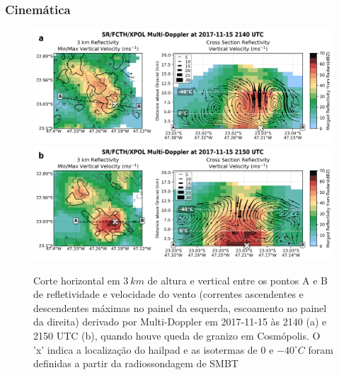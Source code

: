 \subsubsection{Cinemática}\label{cinematica_20171115}

\begin{figure}[htb]
	\centering
	\caption{Corte horizontal em $3\:km$ de altura e vertical entre os pontos A e B de refletividade e velocidade do vento (correntes ascendentes e descendentes máximas no painel da esquerda, escoamento no painel da direita) derivado por Multi-Doppler em 2017-11-15 às 2140 (a) e 2150 UTC (b), quando houve queda de granizo em Cosmópolis. O 'x' indica a localização do hailpad e as isotermas de $0$ e $-40^{\circ}C$ foram definidas a partir da radiossondagem de SMBT} 
	\label{doppler_20171115}
	\vspace{-5pt}
	\includegraphics[width=\columnwidth]{../MultiDoppler_Processing/figures/SR-FCTH-XPOL 2017-11-15 2140 UTC.png}
	\label{dopplera_20171115} \\
	\vspace{-15pt}
	\includegraphics[width=\columnwidth]{../MultiDoppler_Processing/figures/SR-FCTH-XPOL 2017-11-15 2150 UTC.png}
	\label{dopplerb_20171115} \\
	\vspace{-5pt}
\end{figure}
